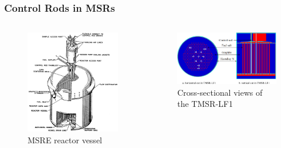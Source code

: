 \begin{frame}
  \frametitle{Control Rods in MSRs}
  \begin{columns}
    \hfill
    \column[t]{5cm}
    \begin{figure}
      \centering
      \includegraphics[width=\columnwidth]{images/msre-cutout}
      \caption{\footnotesize MSRE reactor vessel \cite{robertson_msre_1965}}
    \end{figure}
    \hfill
    \column[t]{6cm}
    \begin{figure}
      \centering
      \includegraphics[width=.8\columnwidth]{images/tmsr}
      \caption{\footnotesize Cross-sectional views of the TMSR-LF1
      \cite{liu_sensitivityuncertainty_2020}}

\end{figure}
\end{columns}
\end{frame}
